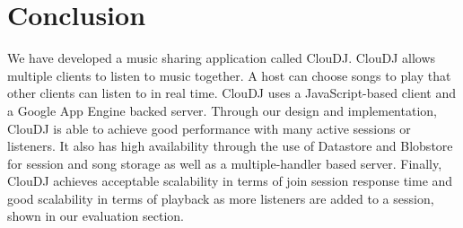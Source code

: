 \section{Conclusion}
    \label{sec:conc}
We have developed a music sharing application called ClouDJ.
ClouDJ allows multiple clients to listen to music together. A host
can choose songs to play that other clients can listen to in
real time. ClouDJ uses a JavaScript-based client and a Google App Engine
backed server. Through our design and implementation, ClouDJ
is able to achieve good performance with many active sessions
or listeners. It also has high availability through the use of Datastore and
Blobstore for session and song storage as well as a multiple-handler based server.
Finally, ClouDJ achieves acceptable scalability in terms of join session response time
and good scalability in terms of playback as more listeners are added to a session,
shown in our evaluation section.